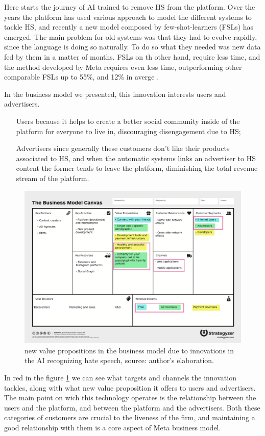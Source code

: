 Here starts the journey of AI trained to remove HS from the
platform. Over the years the platform has used various approach to
model the different systems to tackle HS, and recently a new model
composed by few-shot-learners (FSLs) has emerged. The main problem for
old systems was that they had to evolve rapidly, since the language is
doing so naturally. To do so what they needed was new data fed by them
in a matter of months. FSLs on th other hand, require less time, and
the method developed by Meta requires even less time, outperforming
other comparable FSLs up to 55\%, and 12\% in averge
\cite[pp.~5-8]{art:entailing}.

In the business model we presented, this innovation interests users
and advertisers.
\begin{itemize}
\item[Users] because it helps to create a better social community
  inside of the platform for everyone to live in, discouraging
  disengagement due to HS;
\item[Advertisers] since generally these customers don't like their
  products associated to HS, and when the automatic systems links an
  advertiser to HS content the former tends to leave the platform,
  diminishing the total revenue stream of the platform.
\end{itemize}

\begin{figure}[ht]
  \centering \includegraphics[width=.8\textwidth]{images/newcanvas}
  \caption{new value propositions in the business model due to
    innovations in the AI recognizing hate speech, source: author's
    elaboration.}
  \label{fig:newcanvas}
\end{figure}

In red in the figure \ref{fig:newcanvas} we can see what targets and
channels the innovation tackles, along with what new value proposition
it offers to users and advertisers. The main point on wich this
technology operates is the relationship between the users and the
platform, and between the platform and the advertisers. Both these
categories of customers are crucial to the liveness of the firm, and
maintaining a good relationship with them is a core aspect of Meta
business model.
